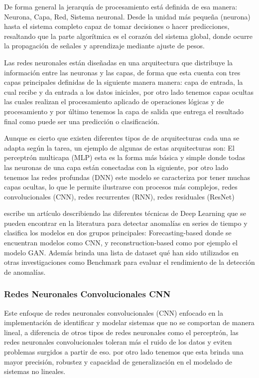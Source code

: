 \documentclass[11pt,a4paper,spanish]{book}
\numberwithin{equation}{chapter}
\numberwithin{figure}{chapter}
\begin{document}
De forma general la jerarquía de procesamiento está definida de esa manera: Neurona, Capa, 
Red, Sistema neuronal. Desde la unidad más pequeña (neurona) hasta el sistema completo 
capaz de tomar decisiones o hacer predicciones, resaltando que la parte algorítmica es 
el corazón del sistema global, donde ocurre la propagación de señales y aprendizaje 
mediante ajuste de pesos. \cite{larranaga2021redes}


Las redes neuronales están diseñadas en una arquitectura que distribuye la información 
entre las neuronas y las capas, de forma que esta cuenta con tres capas principales 
definidas de la siguiente manera manera: capa de entrada, la cual recibe y da entrada a 
los datos iniciales, por otro lado tenemos capas ocultas las cuales realizan el 
procesamiento aplicado de operaciones lógicas y de procesamiento y por último tenemos 
la capa de salida que entrega el resultado final como puede ser una predicción o 
clasificación. \cite{larranaga2021redes} 


Aunque es cierto que existen diferentes tipos de de arquitecturas cada una se adapta 
según la tarea, un ejemplo de algunas de estas arquitecturas son: 
El perceptrón multicapa (MLP) esta es la forma más básica y simple donde todas las 
neuronas de una capa están conectadas con la siguiente, por otro lado tenemos las redes 
profundas (DNN) este modelo se caracteriza por tener muchas capas ocultas, lo que le 
permite ilustrarse con procesos más complejos, redes convolucionales (CNN), redes 
recurrentes (RNN), redes residuales (ResNet)


\cite{Zamanzadeh_Darban_2024} escribe un artículo describiendo las diferentes técnicas 
de Deep Learning que se pueden encontrar en la literatura para detectar anomalías en 
series de tiempo y clasifica los modelos en dos grupos principales: 
Forecasting-based donde se encuentran modelos como CNN, y reconstruction-based 
como por ejemplo el modelo GAN. Además brinda una lista de dataset qué han sido 
utilizados en otras investigaciones como Benchmark para evaluar el rendimiento de la 
detección de anomalías.



\subsubsection{Redes Neuronales Convolucionales CNN}


Este enfoque de redes neuronales convolucionales (CNN) enfocado en la implementación 
de identificar y modelar sistemas que no se comportan de manera lineal, a diferencia 
de otros tipos de redes neuronales como el perceptrón, las redes neuronales 
convolucionales toleran más el ruido de los datos y eviten problemas surgidos a 
partir de eso. por otro lado tenemos que esta brinda una mayor precisión, robustez y 
capacidad de generalización en el modelado de sistemas no lineales. 
\cite{LopezPacheco2017}
\end{document}
